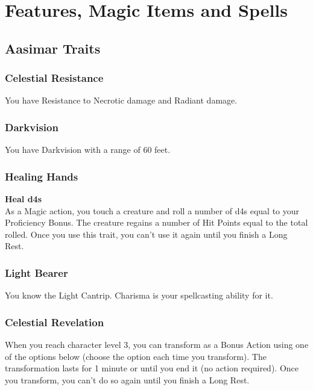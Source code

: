 \documentclass[letterpaper,openany,oneside,twocolumn]{book}
\begin{document}
\onecolumn


\rendercharactersheet

\renderbackgroundsheet

\renderspellsheet


\restoregeometry
\twocolumn

\chapter*{Features, Magic Items and Spells}
\section*{Aasimar Traits}
\subsection*{Celestial Resistance}
You have Resistance to Necrotic damage and Radiant damage.
\subsection*{Darkvision}
You have Darkvision with a range of 60 feet.\\
\subsection*{Healing Hands}
\textbf{Heal d4s}\\
As a Magic action, you touch a creature and roll a number of d4s equal to your Proficiency Bonus. The creature regains a number of Hit Points equal to the total rolled. Once you use this trait, you can't use it again until you finish a Long Rest.
\subsection*{Light Bearer}
You know the Light Cantrip. Charisma is your spellcasting ability for it.
\subsection*{Celestial Revelation}
When you reach character level 3, you can transform as a Bonus Action using one of the options below (choose the option each time you transform). The transformation lasts for 1 minute or until you end it (no action required). Once you transform, you can't do so again until you finish a Long Rest.
\end{document}
